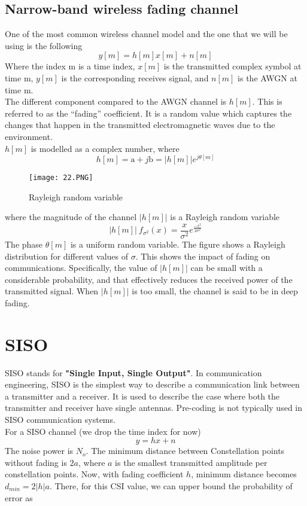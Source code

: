 \subsection{Narrow-band wireless fading channel}
One of the most common wireless channel model and the one that we will be using is the following
\[y[m]=h[m]x[m]+n[m]\]
Where the index m is a time index, $x[m]$ is the transmitted complex symbol at time m, $y[m]$ is the corresponding receives signal, and $n[m]$ is the AWGN at time m.\\
The different component compared to the AWGN channel is $h[m]$. This is referred to as the “fading” coefficient. It is a random value which captures the changes that happen in the transmitted electromagnetic waves due to the environment. \\
$h[m]$ is modelled as a complex number, where
\begin{equation}
    \label{eq:h channel}
    h[m]=\text{a}+j\text{b}= |h[m]| e^{j\theta[m]}
\end{equation}
\begin{wrapfigure}{h}{0.4\textwidth}
    \texttt{[image: 22.PNG]}
  \caption{Rayleigh random variable}
\end{wrapfigure}
where the magnitude of the channel $|h[m]|$ is a Rayleigh random variable
\[|h[m]|  ~ f_{\sigma^2}(x)=\frac{x}{\sigma^2}  e^{\frac{-x^2}{2\sigma^2 }}\]  
The phase $\theta[m]$ is a uniform random variable.
The figure shows a Rayleigh distribution for different values of $\sigma$. This shows the impact of fading on communications. Specifically, the value of $|h[m]|$ can be small with a considerable probability, and that effectively reduces the received power of the transmitted signal. When $|h[m]|$  is too small, the channel is said to be in deep fading. 

\section{SISO}
SISO stands for \textbf{"Single Input, Single Output"}. In communication engineering, SISO is the simplest way to describe a communication link between a transmitter and a receiver. It is used to describe the case where both the transmitter and receiver have single antennas. Pre-coding is not typically used in SISO communication systems. \\
For a SISO channel (we drop the time index for now)
\begin{equation}
    \label{eq:simplest channel model}
    y = hx + n
\end{equation}
The noise power is $N_o$. The minimum distance between Constellation points without fading is $2a$, where $a$ is the smallest transmitted amplitude per constellation points.
Now, with fading coefficient $h$, minimum distance becomes $d_{min}=2|h|a$. There, for this CSI value, we can upper bound the probability of error as

